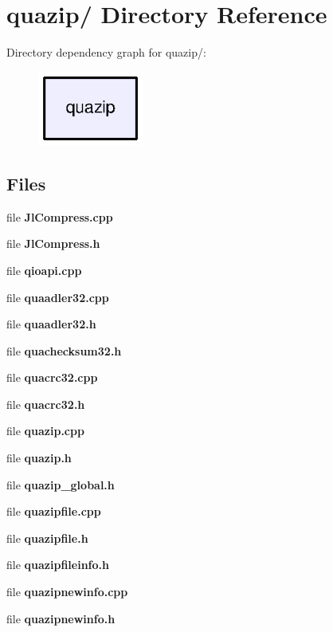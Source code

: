 \section{quazip/ Directory Reference}
\label{dir_13eff9bb9851318b001ebebd72594ac4}
Directory dependency graph for quazip/:
\nopagebreak
\begin{figure}[H]
\begin{center}
\leavevmode
\includegraphics[width=98pt]{dir_13eff9bb9851318b001ebebd72594ac4_dep}
\end{center}
\end{figure}
\subsection*{Files}
\begin{DoxyCompactItemize}
\item 
file {\bfseries JlCompress.cpp}
\item 
file {\bfseries JlCompress.h}
\item 
file {\bfseries qioapi.cpp}
\item 
file {\bfseries quaadler32.cpp}
\item 
file {\bfseries quaadler32.h}
\item 
file {\bfseries quachecksum32.h}
\item 
file {\bfseries quacrc32.cpp}
\item 
file {\bfseries quacrc32.h}
\item 
file {\bfseries quazip.cpp}
\item 
file {\bfseries quazip.h}
\item 
file {\bfseries quazip\_\-global.h}
\item 
file {\bfseries quazipfile.cpp}
\item 
file {\bfseries quazipfile.h}
\item 
file {\bfseries quazipfileinfo.h}
\item 
file {\bfseries quazipnewinfo.cpp}
\item 
file {\bfseries quazipnewinfo.h}
\end{DoxyCompactItemize}
